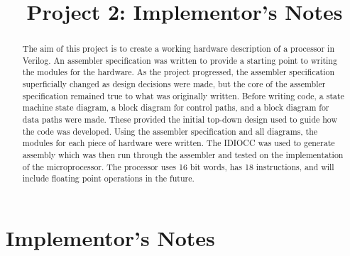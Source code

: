 \documentclass[conference]{IEEEtran}
\begin{document}
\title{Project 2: Implementor's Notes}


\author{}


\maketitle

\begin{abstract}
The aim of this project is to create a working hardware description of a processor in Verilog.
An assembler specification was written to provide a starting point to writing the modules for the hardware.
As the project progressed, the assembler specification superficially changed as design decisions were made, but the core of the assembler specification remained true to what was originally written.
Before writing code, a state machine state diagram, a block diagram for control paths, and a block diagram for data paths were made.
These provided the initial top-down design used to guide how the code was developed.
Using the assembler specification and all diagrams, the modules for each piece of hardware were written.
The IDIOCC was used to generate assembly which was then run through the assembler and tested on the implementation of the microprocessor.
The processor uses 16 bit words, has 18 instructions, and will include floating point operations in the future.
\end{abstract}




%
\IEEEpeerreviewmaketitle



\section{Implementor's Notes}
\end{document}
